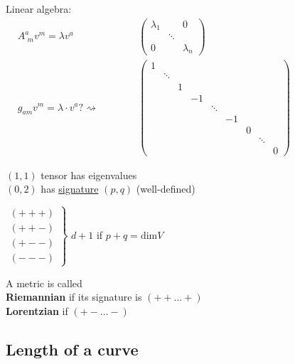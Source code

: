 Linear algebra: \quad \quad \, $ \begin{aligned} & A^a_{\,\,m}v^m = \lambda v^a & \quad \quad \quad \, \left( \begin{matrix} \lambda_1 & & 0 \\
    & \ddots & \\ 
    0 & & \lambda_n \end{matrix} \right) \\
  & g_{am} v^m = \lambda \cdot v^a ? \rightsquigarrow  & \quad \quad \quad \, \left( \begin{matrix} 
    1        &   &    &        &    &   &        & \\
    & \ddots &   &    &        &    &   &        & \\
    &        & 1 &    &        &    &   &        & \\
    &        &   & -1 &        &    &   &        & \\
    &        &   &    & \ddots &    &   &        & \\
    &        &   &    &        & -1 &   &        & \\
    &        &   &    &        &    & 0 &        & \\
    &        &   &    &        &    &   & \ddots & \\
    &        &   &    &        &    &   &        & 0 \end{matrix} \right)
\end{aligned}$

$(1,1)$ tensor has eigenvalues \\
$(0,2)$ has \underline{signature} $(p,q)$ (well-defined)

$\left. \begin{aligned}
  (+++) \\
  (++-) \\
  (+--) \\
  (---) \end{aligned} \right\rbrace$ $d+1$ if $p+q = \text{dim}V$


\begin{definition} A metric is called  \\
\textbf{Riemannian} if its signature is $(++ \dots +)$ \\
\textbf{Lorentzian} if $(+-\dots -)$ 
\end{definition}


\subsection{Length of a curve}

